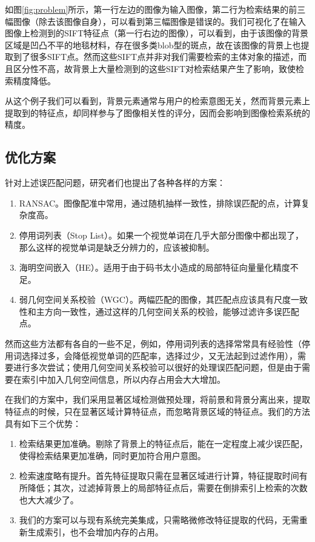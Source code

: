 如图\ref{fig:problem}所示，第一行左边的图像为输入图像，第二行为检索结果的前三幅图像（除去该图像自身），可以看到第三幅图像是错误的。我们可视化了在输入图像上检测到的SIFT特征点（第一行右边的图像），可以看到，由于该图像的背景区域是凹凸不平的地毯材料，存在很多类blob型的斑点，故在该图像的背景上也提取到了很多SIFT点。然而这些SIFT点并非对我们需要检索的主体对象的描述，而且区分性不高，故背景上大量检测到的这些SIFT对检索结果产生了影响，致使检索精度降低。

从这个例子我们可以看到，背景元素通常与用户的检索意图无关，然而背景元素上提取到的特征点，却同样参与了图像相关性的评分，因而会影响到图像检索系统的精度。

\subsection{优化方案}
针对上述误匹配问题，研究者们也提出了各种各样的方案：
\begin{enumerate}
\item RANSAC。图像配准中常用，通过随机抽样一致性，排除误匹配的点，计算复杂度高。
\item 停用词列表（Stop List）\cite{sivic2003video}。如果一个视觉单词在几乎大部分图像中都出现了，那么这样的视觉单词是缺乏分辨力的，应该被抑制。
\item 海明空间嵌入（HE）\cite{jegou2008hamming}。适用于由于码书太小造成的局部特征向量量化精度不足。
\item 弱几何空间关系校验（WGC）\cite{jegou2010improving}。两幅匹配的图像，其匹配点应该具有尺度一致性和主方向一致性，通过这样的几何空间关系的校验，能够过滤许多误匹配点。
\end{enumerate}

然而这些方法都有各自的一些不足，例如，停用词列表的选择常常具有经验性（停用词选择过多，会降低视觉单词的匹配率，选择过少，又无法起到过滤作用），需要进行多次尝试；使用几何空间关系校验可以很好的处理误匹配问题，但是由于需要在索引中加入几何空间信息，所以内存占用会大大增加。

在我们的方案中，我们采用显著区域检测做预处理，将前景和背景分离出来，提取特征点的时候，只在显著区域计算特征点，而忽略背景区域的特征点。我们的方法具有如下三个优势：
\begin{enumerate}
\item 检索结果更加准确。剔除了背景上的特征点后，能在一定程度上减少误匹配，使得检索结果更加准确，同时更加符合用户意图。
\item 检索速度略有提升。首先特征提取只需在显著区域进行计算，特征提取时间有所降低；其次，过滤掉背景上的局部特征点后，需要在倒排索引上检索的次数也大大减少了。
\item 我们的方案可以与现有系统完美集成，只需略微修改特征提取的代码，无需重新生成索引，也不会增加内存的占用。
\end{enumerate}

